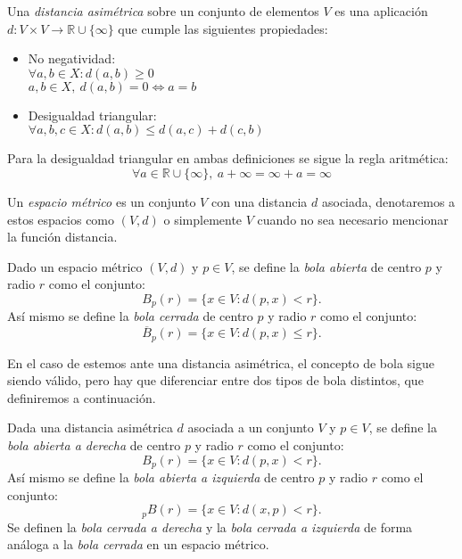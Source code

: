 \begin{definicion}
	Una \textit{distancia asimétrica} sobre un conjunto de elementos $V$ es una aplicación $d:V\times V\rightarrow \mathbb{R}\cup \{\infty\}$ que cumple las siguientes propiedades:
	\begin{itemize}
		\item No negatividad:
		\\ \hspace*{1cm}$\forall a,b\in X:d(a,b) \geq 0$
		\\ \hspace*{1cm}$a,b \in X,\ d(a,b)=0\Leftrightarrow a=b$
		\item Desigualdad triangular:
		\\ \hspace*{1cm}$\forall a,b,c \in X: d(a,b)\leq d(a,c)+d(c,b)$
	\end{itemize}
\end{definicion}

Para la desigualdad triangular en ambas definiciones se sigue la regla aritmética:
$$\forall a\in \mathbb{R}\cup \{\infty\},\ a+\infty=\infty+a=\infty$$

\begin{definicion}
	Un \textit{espacio métrico} es un conjunto $V$ con una distancia $d$ asociada, denotaremos a estos espacios como $(V,d)$ o simplemente $V$ cuando no sea necesario mencionar la función distancia.
\end{definicion}

\begin{definicion}
	Dado un espacio métrico $(V,d)$ y $p \in V$, se define la \textit{bola abierta} de centro $p$ y radio $r$ como el conjunto:
	$$B_p(r) = \{x \in V : d(p,x) < r\}.$$
	Así mismo se define la \textit{bola cerrada} de centro $p$ y radio $r$ como el conjunto:
	$$\overline B_p(r) = \{x \in V : d(p,x) \leq r\}.$$
\end{definicion}


En el caso de estemos ante una distancia asimétrica, el concepto de bola sigue siendo válido, pero hay que diferenciar entre dos tipos de bola distintos, que definiremos a continuación.

\begin{definicion}
	Dada una distancia asimétrica $d$ asociada a un conjunto $V$ y $p \in V$, se define la \textit{bola abierta a derecha} de centro $p$ y radio $r$ como el conjunto:
	$$B_p(r) = \{x \in V : d(p,x) < r\}.$$
	Así mismo se define la \textit{bola abierta a izquierda} de centro $p$ y radio $r$ como el conjunto:
	$$_pB(r) = \{x \in V : d(x,p) < r\}.$$
	Se definen la \textit{bola cerrada a derecha} y la \textit{bola cerrada a izquierda} de forma análoga a la \textit{bola cerrada} en un espacio métrico.
\end{definicion}

